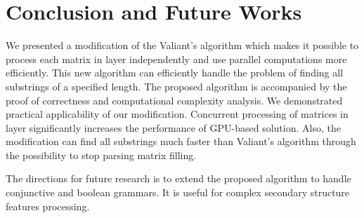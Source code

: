\section{Conclusion and Future Works}

We presented a modification of the Valiant's algorithm which makes it possible to process each matrix in layer independently and use parallel computations more efficiently.
This new algorithm can efficiently handle the problem of finding all substrings of a specified length.
The proposed algorithm is accompanied by the proof of correctness and computational complexity analysis.
We demonstrated practical applicability of our modification. 
Concurrent processing of matrices in layer significantly increases the performance of GPU-based solution. 
Also, the modification can find all substrings much faster than Valiant's algorithm through the possibility to stop parsing matrix filling.

The directions for future research is to extend the proposed algorithm to handle conjunctive and boolean grammars.
It is useful for complex secondary structure features processing.